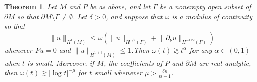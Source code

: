 \documentclass[12pt,twoside]{amsart}
\numberwithin{equation}{section}
\renewcommand{\leq}{\leqslant}
\newtheorem{theorem}{Theorem}[section]
\newcommand {\p} {\partial}
\newcommand{\abs}[1]{\lvert #1 \rvert}          %
\newcommand{\norm}[1]{\lVert #1 \rVert}         %
\newcommand{\ol}[1]{\overline{#1}}
\begin{document}
\begin{theorem}
Let $M$ and $P$ be as above, and let $\Gamma$ be a nonempty open subset of $\p M$ so that $\p M \setminus \ol{\Gamma} \neq \emptyset$. Let $\delta > 0$, and suppose that $\omega$ is a modulus of continuity so that 
\begin{equation} \label{ucp_smooth_inequality_first}
\norm{u}_{H^1(M)} \leq \omega(\norm{u}_{H^{1/2}(\Gamma)} + \norm{\p_{\nu} u}_{H^{-1/2}(\Gamma)})
\end{equation}
whenever $Pu = 0$ and $\norm{u}_{H^{1+\delta}(M)} \leq 1$.Then $\omega(t) \gtrsim t^{\alpha}$ for any $\alpha \in (0,1)$ when $t$ is small. Moreover, if $M$, the coefficients of $P$ and $\p M$ are real-analytic, then $\omega(t) \gtrsim \abs{\log t}^{-\mu}$ for $t$ small whenever $\mu > \frac{\delta n}{n-1}$.
\end{theorem}
\end{document}
